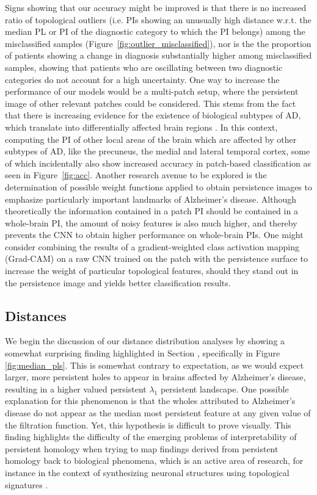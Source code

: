 \documentclass{article}
\begin{document}
Signs showing that our accuracy might be improved is that there is no increased ratio of topological
outliers (i.e. PIs showing an unusually high distance w.r.t. the median PL or PI of the diagnostic
category to which the PI belongs) among the misclassified samples
(Figure~\ref{fig:outlier_misclassified}), nor is the the proportion of patients showing a change in
diagnosis substantially higher among misclassified samples, showing that patients who are
oscillating between two diagnostic categories do not account for a high uncertainty. One way to
increase the performance of our models would be a multi-patch setup, where the persistent image of
other relevant patches could be considered. This stems from the fact that there is increasing
evidence for the existence of biological subtypes of AD, which translate into differentially affected
brain regions \citep{poulakis2018heterogeneous, tijms2020pathophysiological}. In this context,
computing the PI of other local areas of the brain which are affected by other subtypes of AD, like
the precuneus, the medial and lateral temporal cortex, some of which incidentally also show
increased accuracy in patch-based classification as seen in Figure~\ref{fig:acc}. Another research
avenue to be explored is the determination of possible weight functions applied to obtain
persistence images to emphasize particularly important landmarks of Alzheimer's disease. Although
theoretically the information contained in a patch PI should be contained in a whole-brain PI, the
amount of noisy features is also much higher, and thereby prevents the CNN to obtain higher
performance on whole-brain PIs. One might consider combining the results of a gradient-weighted
class activation mapping (Grad-CAM) on a raw CNN trained on the patch with the persistence surface
to increase the weight of particular topological features, should they stand out in the persistence
image and yields better classification results.


\subsection{Distances}\label{sec:disc-dist}

We begin the discussion of our distance distribution analyses by showing a somewhat surprising
finding highlighted in Section \label{sec:results_between_images}, specifically in Figure
\ref{fig:median_pls}. This is somewhat contrary to expectation, as we would expect larger, more
persistent holes to appear in brains affected by Alzheimer's disease, resulting in a higher valued
persistent $\lambda_1$ persistent landscape. One possible explanation for this phenomenon is that
the wholes attributed to Alzheimer's disease do not appear as the median most persistent feature at
any given value of the filtration function. Yet, this hypothesis is difficult to prove visually.
This finding highlights the difficulty of the emerging problems of interpretability of persistent
homology when trying to map findings derived from persistent homology back to biological phenomena,
which is an active area of research, for instance in the context of synthesizing neuronal structures
using topological signatures \citep{vanherpe2016framework}.
\end{document}
